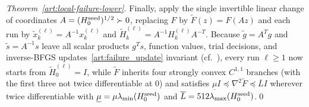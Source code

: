 \begin{proof}[Theorem~\ref{art:local-failure-lower}]
Finally, apply the single invertible linear change of coordinates
$A=(H_0^{\rm seed})^{1/2}\succ0$, replacing $F$ by $\widetilde F(z)=F(Az)$ and
each run by $\widetilde x_k^{(\ell)}=A^{-1}x_k^{(\ell)}$ and
$\widetilde H_k^{(\ell)}=A^{-1}H_k^{(\ell)}A^{-T}$. Because $\widetilde g=A^Tg$
and $\widetilde s=A^{-1}s$ leave all scalar products $g^Ts$, function values,
trial decisions, and inverse-BFGS updates~\eqref{art:failure_update} invariant
(cf.~\cite[Section~2]{LO}), every run $\ell\ge1$ now starts from
$\widetilde H_0^{(\ell)}=I$, while $\widetilde F$ inherits four strongly convex
$C^{1,1}$ branches (with the first three not twice differentiable at $0$) and
satisfies $\underline\mu I\preceq\nabla^2\widetilde F\preceq\overline L I$
wherever twice differentiable with $\underline\mu=\mu\lambda_{\min}(H_0^{\rm seed})$
and $\overline L=512\lambda_{\max}(H_0^{\rm seed})$.\qed
\end{proof}

